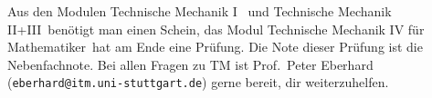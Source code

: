 \begin{center}
\end{center}
Aus den Modulen \glqq Technische Mechanik I\grqq
~und \glqq Technische Mechanik II+III\grqq~benötigt man einen Schein,
das Modul \glqq Technische Mechanik IV
für Mathematiker\grqq~hat am Ende eine Prüfung.
Die Note dieser Prüfung ist die Nebenfachnote.
Bei allen Fragen zu TM ist Prof.~Peter Eberhard
(\texttt{eberhard@itm.uni-stuttgart.de}) gerne bereit, dir weiterzuhelfen.


